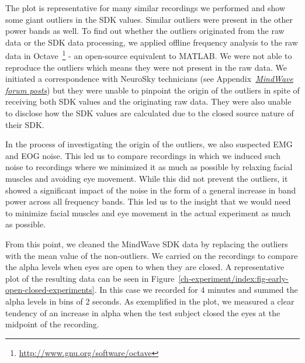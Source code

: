 \documentclass[a4paper,10pt,english,lof,lot,twoside]{puthesis}
\begin{document}
The plot is representative for many similar recordings we performed and show some giant
outliers in the SDK values. Similar outliers were present in the other power
bands as well. To find out whether the outliers originated from the raw data or
the SDK data processing, we applied offline frequency analysis to the raw data
in Octave \footnote{
\href{http://www.gnu.org/software/octave}{http://www.gnu.org/software/octave}
} - an open-source equivalent to
MATLAB.  We were not able to reproduce the outliers which means they were not
present in the raw data. We initiated a correspondence with NeuroSky technicians
(see Appendix {\hyperref[appendix_experiment_mindwave_fora_posts:appendix-experiment-mindwave-fora-posts]{\emph{MindWave forum posts}}}) but they
were unable to pinpoint the origin of the outliers in spite of receiving both
SDK values and the originating raw data. They were also unable to disclose how
the SDK values are calculated due to the closed source nature of their SDK.

In the process of investigating the origin of the outliers, we also suspected
EMG and EOG noise. This led us to compare recordings in which we induced such
noise to recordings where we minimized it as much as possible by relaxing facial
muscles and avoiding eye movement.  While this did not prevent the outliers, it
showed a significant impact of the noise in the form of a general increase in band power
across all frequency bands. This led us to the insight that we would need to
minimize facial muscles and eye movement in the actual experiment as much as
possible.

From this point, we cleaned the MindWave SDK data by replacing the outliers with
the mean value of the non-outliers. We carried on the recordings to compare the
alpha levels when eyes are open to when they are closed. A representative plot
of the resulting data can be seen in Figure \ref{ch-experiment/index:fig-early-open-closed-experiments}.  In this case we recorded for 4
minutes and summed the alpha levels in bins of 2 seconds. As exemplified in the
plot, we measured a clear tendency of an increase in alpha when the test subject
closed the eyes at the midpoint of the recording.
\end{document}
